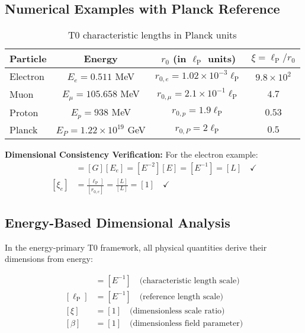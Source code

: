 \documentclass[12pt,a4paper]{report}
\newcommand{\lP}{\ell_{\text{P}}}         %
\newcommand{\rzero}{r_0}                  %
\begin{document}
	\subsection{Numerical Examples with Planck Reference}\label{subsec:numerical_examples}
	
	\begin{table}[htbp]
		\centering
		\begin{tabular}{lccc}
			\toprule
			\textbf{Particle} & \textbf{Energy} & \textbf{$\rzero$ (in $\lP$ units)} & \textbf{$\xi = \lP/\rzero$} \\
			\midrule
			Electron & $E_e = 0.511$ MeV & $r_{0,e} = 1.02 \times 10^{-3} \lP$ & $9.8 \times 10^{2}$ \\
			Muon & $E_\mu = 105.658$ MeV & $r_{0,\mu} = 2.1 \times 10^{-1} \lP$ & $4.7$ \\
			Proton & $E_p = 938$ MeV & $r_{0,p} = 1.9 \lP$ & $0.53$ \\
			Planck & $E_P = 1.22 \times 10^{19}$ GeV & $r_{0,P} = 2\lP$ & $0.5$ \\
			\bottomrule
		\end{tabular}
		\caption{T0 characteristic lengths in Planck units}
		\label{tab:t0_scales_planck}
	\end{table}
	
	\textbf{Dimensional Consistency Verification:}
	For the electron example:
	\begin{align}
		[r_{0,e}] &= [G][E_e] = [E^{-2}][E] = [E^{-1}] = [L] \quad \checkmark \\
		[\xi_{e}] &= \frac{[\lP]}{[r_{0,e}]} = \frac{[L]}{[L]} = [1] \quad \checkmark
	\end{align}
	
	\subsection{Energy-Based Dimensional Analysis}\label{subsec:energy_dimensional_analysis}
	
	In the energy-primary T0 framework, all physical quantities derive their dimensions from energy:
	
	\begin{align}
		[\rzero] &= [E^{-1}] \quad \text{(characteristic length scale)} \\
		[\lP] &= [E^{-1}] \quad \text{(reference length scale)} \\
		[\xi] &= [1] \quad \text{(dimensionless scale ratio)} \\
		[\beta] &= [1] \quad \text{(dimensionless field parameter)}
	\end{align}
	
\end{document}
